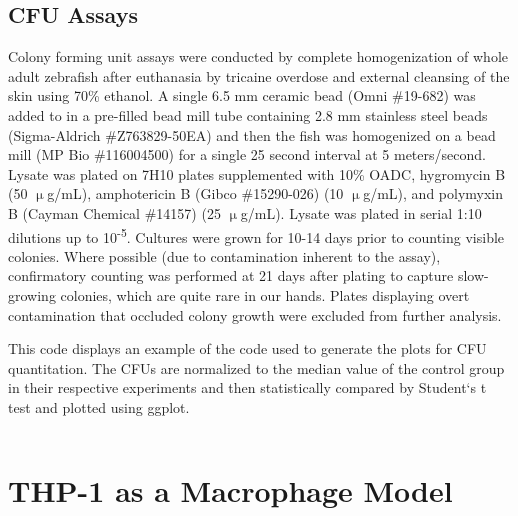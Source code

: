 \subsection{CFU Assays}\label{cfuassay}

Colony forming unit assays were conducted by complete homogenization of whole adult zebrafish after euthanasia by tricaine overdose and external cleansing of the skin using 70\% ethanol. A single 6.5 mm ceramic bead (Omni \#19-682) was added to in a pre-filled bead mill tube containing 2.8 mm stainless steel beads (Sigma-Aldrich \#Z763829-50EA) and then the fish was homogenized on a bead mill (MP Bio \#116004500) for a single 25 second interval at 5 meters/second. Lysate was plated on 7H10 plates supplemented with 10\% OADC,  hygromycin B (50 $\upmu$g/mL), amphotericin B (Gibco \#15290-026) (10 $\upmu$g/mL), and polymyxin B (Cayman Chemical \#14157) (25 $\upmu$g/mL). Lysate was plated in serial 1:10 dilutions up to 10\textsuperscript{-5}. Cultures were grown for 10-14 days prior to counting visible colonies. Where possible (due to contamination inherent to the assay), confirmatory counting was performed at 21 days after plating to capture slow-growing colonies, which are quite rare in our hands. Plates displaying overt contamination that occluded colony growth were excluded from further analysis.

\begin{code}
\caption{This code displays an example of the code used to generate the plots for CFU quantitation. The CFUs are normalized to the median value of the control group in their respective experiments and then statistically compared by Student`s t test and plotted using ggplot.}
\label{cfuanalysis}

\inputminted[breaklines,frame=single,fontsize=\small]{r}{source/cfu_plot_example.R}

\end{code}

\section{THP-1 as a Macrophage Model}\label{thp1}

